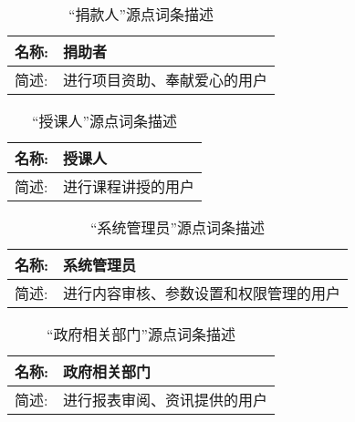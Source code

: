 \begin{table}[H]
  \begin{center}
    \caption{“捐款人”源点词条描述}
    \begin{tabular}{l p{11cm}} 
      \hline
      名称: & 捐助者\\
      \hline
      简述: & 进行项目资助、奉献爱心的用户\\
      \hline
    \end{tabular}
  \end{center}
\end{table}


\begin{table}[H]
  \begin{center}
    \caption{“授课人”源点词条描述}
    \begin{tabular}{l p{11cm}} 
      \hline
      名称: & 授课人\\
      \hline
      简述: & 进行课程讲授的用户\\
      \hline
    \end{tabular}
  \end{center}
\end{table}

\begin{table}[H]
  \begin{center}
    \caption{“系统管理员”源点词条描述}
    \begin{tabular}{l p{11cm}} 
      \hline
      名称: & 系统管理员\\
      \hline
      简述: & 进行内容审核、参数设置和权限管理的用户\\
      \hline
    \end{tabular}
    \label{tab_government}
  \end{center}
\end{table}

\begin{table}[H]
  \begin{center}
    \caption{“政府相关部门”源点词条描述}
    \begin{tabular}{l p{11cm}} 
      \hline
      名称: & 政府相关部门\\
      \hline
      简述: & 进行报表审阅、资讯提供的用户\\
      \hline
    \end{tabular}
    \label{tab_government}
  \end{center}
\end{table}
